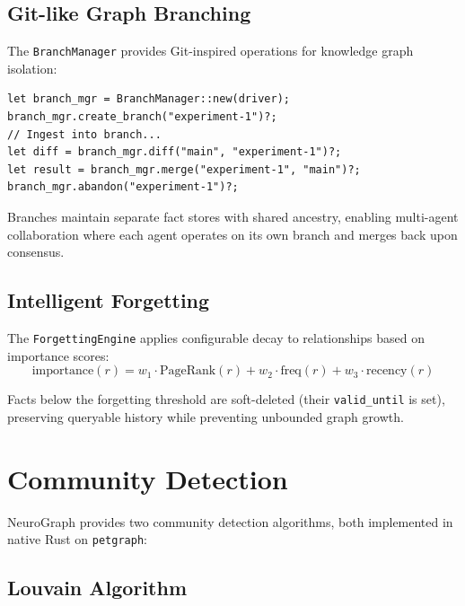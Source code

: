 \documentclass[11pt,twocolumn]{article}
\begin{document}
\subsection{Git-like Graph Branching}

The \texttt{BranchManager} provides Git-inspired operations for knowledge graph isolation:

\begin{lstlisting}[style=rustcode,caption={Branch operations}]
let branch_mgr = BranchManager::new(driver);
branch_mgr.create_branch("experiment-1")?;
// Ingest into branch...
let diff = branch_mgr.diff("main", "experiment-1")?;
let result = branch_mgr.merge("experiment-1", "main")?;
branch_mgr.abandon("experiment-1")?;
\end{lstlisting}

Branches maintain separate fact stores with shared ancestry, enabling multi-agent collaboration where each agent operates on its own branch and merges back upon consensus.

\subsection{Intelligent Forgetting}

The \texttt{ForgettingEngine} applies configurable decay to relationships based on importance scores:
\begin{equation}
\text{importance}(r) = w_1 \cdot \text{PageRank}(r) + w_2 \cdot \text{freq}(r) + w_3 \cdot \text{recency}(r)
\end{equation}

Facts below the forgetting threshold are soft-deleted (their \texttt{valid\_until} is set), preserving queryable history while preventing unbounded graph growth.

\section{Community Detection}
\label{sec:community}

NeuroGraph provides two community detection algorithms, both implemented in native Rust on \texttt{petgraph}:

\subsection{Louvain Algorithm}
\end{document}
